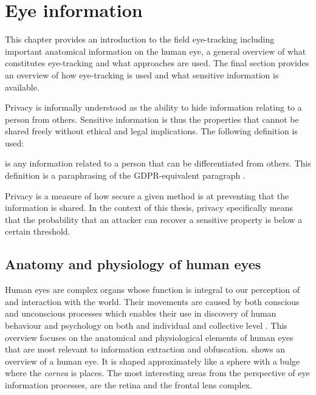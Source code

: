\chapter{Eye information}
This chapter provides an introduction to the field eye-tracking including important anatomical information on the human eye, a general overview of what constitutes eye-tracking and what approaches are used. The final section provides an overview of how eye-tracking is used and what sensitive information is available. 

Privacy is informally understood as the ability to hide information relating to a person from others. Sensitive information is thus the properties that cannot be shared freely without ethical and legal implications. The following definition is used:
\begin{definition} 
	is any information related to a person that can be differentiated from others. This definition is a paraphrasing of the GDPR-equivalent paragraph \parencite{eu-gdpr}.
\end{definition}

Privacy is a measure of how secure a given method is at preventing that the information is shared. In the context of this thesis, privacy specifically means that the probability that an attacker can recover a sensitive property is below a certain threshold.



\section{Anatomy and physiology of human eyes}\label{sec:anatomy}
Human eyes are complex organs whose function is integral to our perception of and interaction with the world. Their movements are caused by both conscious and unconscious processes which enables their use in discovery of human behaviour and psychology on both and individual and collective level \parencite{methodology}. This overview focuses on the anatomical and physiological elements of human eyes that are most relevant to information extraction and obfuscation.  shows an overview of a human eye. It is shaped approximately like a sphere with a bulge where the \emph{cornea} is places. The most interesting areas from the perspective of eye information processes, are the retina and the frontal lens complex. 


